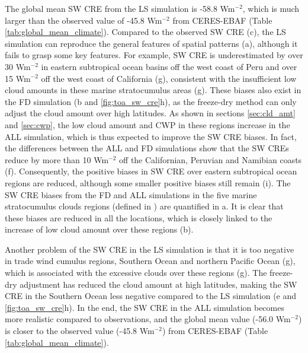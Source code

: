 The global mean SW CRE from the LS simulation is -58.8 Wm$^{-2}$, which is much larger than the observed value of -45.8 Wm$^{-2}$ from CERES-EBAF (Table \ref{tab:global_mean_climate}). Compared to the observed SW CRE (c), the LS simulation can reproduce the general features of spatial patterns (a), although it fails to grasp some key features. For example, SW CRE is underestimated by over 30 Wm$^{-2}$ in eastern subtropical ocean basins off the west coast of Peru and over 15 Wm$^{-2}$ off the west coast of California (g), consistent with the insufficient low cloud amounts in these marine stratocumulus areas (g). These biases also exist in the FD simulation (b and \ref{fig:toa_sw_cre}h), as the freeze-dry method can only adjust the cloud amount over high latitudes. As shown in sections \ref{sec:cld_amt} and \ref{sec:cwp}, the low cloud amount and CWP in these regions increase in the ALL simulation, which is thus expected to improve the SW CRE biases. In fact, the differences between the ALL and FD simulations show that the SW CREs reduce by more than 10 Wm$^{-2}$ off the Californian, Peruvian and Namibian coasts (f). Consequently, the positive biases in SW CRE over eastern subtropical ocean regions are reduced, although some smaller positive biases still remain (i). The SW CRE biases from the FD and ALL simulations in the five marine stratocumulus clouds regions (defined in ) are quantified in a. It is clear that these biases are reduced in all the locations, which is closely linked to the increase of low cloud amount over these regions (b).

Another problem of the SW CRE in the LS simulation is that it is too negative in trade wind cumulus regions, Southern Ocean and northern Pacific Ocean (g), which is associated with the excessive clouds over these regions (g). The freeze-dry adjustment has reduced the cloud amount at high latitudes, making the SW CRE in the Southern Ocean less negative compared to the LS simulation (e and \ref{fig:toa_sw_cre}h). In the end, the SW CRE in the ALL simulation becomes more realistic compared to observations, and the global mean value (-56.0 Wm$^{-2}$) is closer to the observed value (-45.8 Wm$^{-2}$) from CERES-EBAF (Table \ref{tab:global_mean_climate}).

